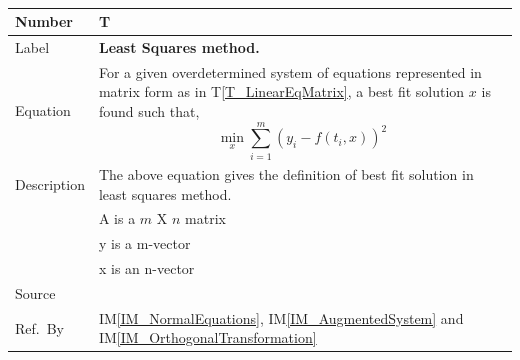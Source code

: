 \documentclass[12pt]{article}
\newcommand{\colAwidth}{0.13\textwidth}
\newcommand{\colBwidth}{0.82\textwidth}
\newcounter{theorynum} %
\newcommand{\tref}[1]{T\ref{#1}}
\newcommand{\iref}[1]{IM\ref{#1}}
\begin{document}
~\newline
\noindent
\begin{minipage}{\textwidth}
	\renewcommand*{\arraystretch}{1.5}
	\begin{tabular}{| p{\colAwidth} | p{\colBwidth}|}
		\hline
		\rowcolor[gray]{0.9}
		Number& T{theorynum}\thetheorynum \label{T_LeastSquares}\\
		\hline
		Label&\bf Least Squares method.\\
		\hline
		Equation& For a given overdetermined system of equations represented in matrix form as in \tref{T_LinearEqMatrix}, a best fit solution $x$ is found such that,  
		\begin{equation*}
		\min_{x}\sum_{i=1}^{m} (y_i - f(t_i,x)) ^2
		\end{equation*} \\
		\hline
		Description & The above equation gives the definition of best fit solution in least squares method.\\
		& A is a $m$ X $n$ matrix\\
		& y is a m-vector\\
		& x is an n-vector\\
		\hline
		Source & ~\cite{Health1997}\\
		
		\hline
		Ref.\ By &\iref{IM_NormalEquations}, \iref{IM_AugmentedSystem} and \iref{IM_OrthogonalTransformation}\\
		\hline
	\end{tabular}
\end{minipage}\\
~\newline

\end{document}

